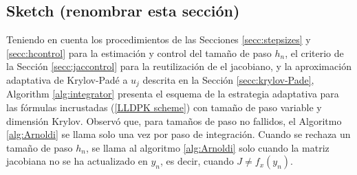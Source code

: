 \subsection{Sketch (renombrar esta sección)}

Teniendo en cuenta los procedimientos de las Secciones \ref{secc:stepsizes} y \ref{secc:hcontrol} para la estimación y control del tamaño de paso $h_n$, el criterio de la Sección \ref{secc:jaccontrol} para la reutilización de el jacobiano, y la aproximación adaptativa de Krylov-Padé a $u_j$ descrita en la Sección \ref{secc:krylov-Pade}, Algorithm \ref{alg:integrator} presenta el esquema de la estrategia adaptativa para las fórmulas incrustadas (\ref{LLDPK scheme}) con tamaño de paso variable y dimensión Krylov. Observó que, para tamaños de paso no fallidos, el Algoritmo \ref{alg:Arnoldi} se llama solo una vez por paso de integración. Cuando se rechaza un tamaño de paso $h_n$, se llama al algoritmo \ref{alg:Arnoldi} solo cuando la matriz jacobiana no se ha actualizado en $y_n$, es decir, cuando $J \neq f_x(y_n)$.


